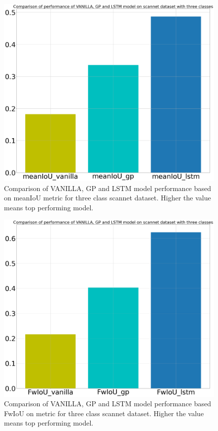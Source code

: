 	\begin{figure}
		\centering
		\includegraphics[width=12cm]{images/three_classes_meanIoU.png}
		\caption{Comparison of VANILLA, GP and LSTM model performance based on  meanIoU metric for three class scannet dataset. Higher the value means top performing model.}
		\label{fig:performance_metric_three_classes_unet}
	\end{figure}

	\begin{figure}
		\centering
		\includegraphics[width=12cm]{images/three_classes_FwIoU.png}
		\caption{Comparison of VANILLA, GP and LSTM model performance based  FwIoU on metric for three class scannet dataset. Higher the value means top performing model.}
		\label{fig:performance_metric_three_classes_unet}
	\end{figure}

